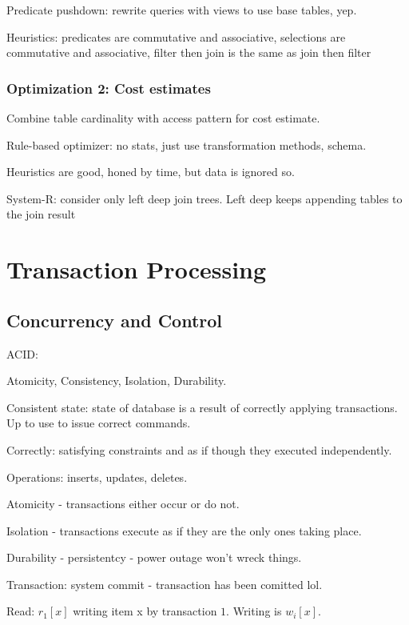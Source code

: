 \documentclass{article}
\begin{document}
			Predicate pushdown: rewrite queries with views to use base tables, yep.
			
			Heuristics: predicates are commutative and associative, selections are commutative and associative, filter then join is the same as join then filter
			
		\subsubsection{Optimization 2: Cost estimates}
		
			Combine table cardinality with access pattern for cost estimate.
			
			Rule-based optimizer: no stats, just use transformation methods, schema.
			
			Heuristics are good, honed by time, but data is ignored so.
			
			System-R: consider only left deep join trees. Left deep keeps appending tables to the join result
			
\section{Transaction Processing}

	

	\subsection{Concurrency and Control}
	
		ACID:
		
		Atomicity, Consistency, Isolation, Durability.
		
		Consistent state: state of database is a result of correctly applying transactions. Up to use to issue correct commands.
		
		Correctly: satisfying constraints and as if though they executed independently.
		
		Operations: inserts, updates, deletes.
		
		Atomicity - transactions either occur or do not.
			
		Isolation - transactions execute as if they are the only ones taking place.
			
		Durability - persistentcy - power outage won't wreck things.
		
		Transaction: system commit - transaction has been comitted lol.
		
		Read: $r_1[x]$ writing item x by transaction $1$. Writing is $w_i[x]$.
		
\end{document}

